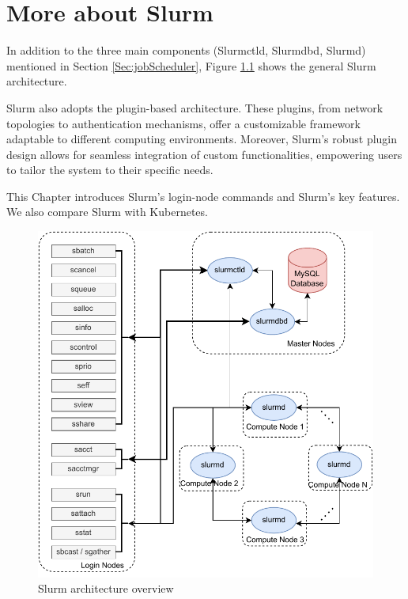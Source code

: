 \chapter{More about Slurm}

In addition to the three main components (Slurmctld, Slurmdbd, Slurmd) mentioned in Section \ref{Sec:jobScheduler}, Figure \ref{fig_slurm_overview} shows the general Slurm architecture.

Slurm also adopts the plugin-based architecture. These plugins, from network topologies to authentication mechanisms, offer a customizable framework adaptable to different computing environments. Moreover, Slurm's robust plugin design allows for seamless integration of custom functionalities, empowering users to tailor the system to their specific needs.

This Chapter introduces Slurm's login-node commands and Slurm's key features. We also compare Slurm with Kubernetes.

\begin{figure}[tb]
    \centering
    \includegraphics[width=1\textwidth]{figures/slurm-overview.pdf}
    \caption{Slurm architecture overview}
    \label{fig_slurm_overview}
\end{figure}



